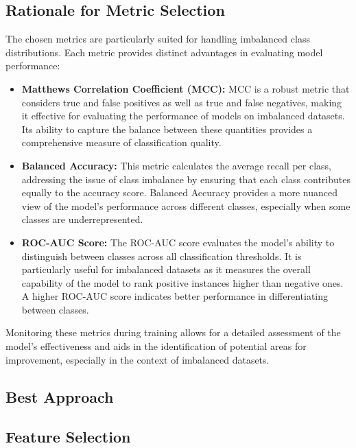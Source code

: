 \documentclass[10pt,twocolumn,letterpaper]{article}
\begin{document}
\subsection{Rationale for Metric Selection}

The chosen metrics are particularly suited for handling imbalanced class distributions. Each metric provides distinct advantages in evaluating model performance:

\begin{itemize}
    \item \textbf{Matthews Correlation Coefficient (MCC):} MCC is a robust metric that considers true and false positives as well as true and false negatives, making it effective for evaluating the performance of models on imbalanced datasets. 
    Its ability to capture the balance between these quantities provides a comprehensive measure of classification quality.
    \item \textbf{Balanced Accuracy:} This metric calculates the average recall per class, addressing the issue of class imbalance by ensuring that each class contributes equally to the accuracy score. 
    Balanced Accuracy provides a more nuanced view of the model's performance across different classes, especially when some classes are underrepresented.
    \item \textbf{ROC-AUC Score:} The ROC-AUC score evaluates the model's ability to distinguish between classes across all classification thresholds. 
    It is particularly useful for imbalanced datasets as it measures the overall capability of the model to rank positive instances higher than negative ones. A higher ROC-AUC score indicates better performance in differentiating between classes.
\end{itemize}

Monitoring these metrics during training allows for a detailed assessment of the model's effectiveness and aids in the identification of potential areas for improvement, especially in the context of imbalanced datasets.


\subsection{Best Approach}
\subsection{Feature Selection}
\end{document}
